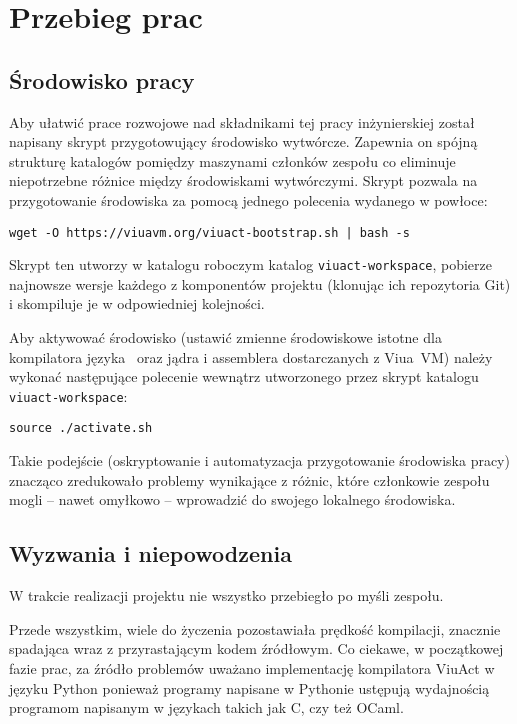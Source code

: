 \chapter{Przebieg prac}
\label{przebieg_prac}

\section*{Środowisko pracy}

Aby ułatwić prace rozwojowe nad składnikami tej pracy inżynierskiej został
napisany skrypt przygotowujący środowisko wytwórcze. Zapewnia on spójną
strukturę katalogów pomiędzy maszynami członków zespołu co eliminuje
niepotrzebne różnice między środowiskami wytwórczymi. Skrypt pozwala na
przygotowanie środowiska za pomocą jednego polecenia wydanego w powłoce:
\begin{lstlisting}
wget -O https://viuavm.org/viuact-bootstrap.sh | bash -s
\end{lstlisting}

Skrypt ten utworzy w katalogu roboczym katalog \texttt{viuact-workspace},
pobierze najnowsze wersje każdego z komponentów projektu (klonując ich
repozytoria Git) i skompiluje je w odpowiedniej kolejności.

Aby aktywować środowisko (ustawić zmienne środowiskowe istotne dla kompilatora
języka \ViuAct\ oraz jądra i assemblera dostarczanych z Viua~VM) należy wykonać
następujące polecenie wewnątrz utworzonego przez skrypt katalogu
\texttt{viuact-workspace}:
\begin{lstlisting}
source ./activate.sh
\end{lstlisting}

Takie podejście (oskryptowanie i automatyzacja przygotowanie środowiska pracy)
znacząco zredukowało problemy wynikające z różnic, które członkowie zespołu
mogli -- nawet omyłkowo -- wprowadzić do swojego lokalnego środowiska.







\section{Wyzwania i niepowodzenia}

W trakcie realizacji projektu nie wszystko przebiegło po myśli zespołu.

Przede wszystkim, wiele do życzenia pozostawiała prędkość kompilacji, znacznie
spadająca wraz z przyrastającym kodem źródłowym. Co ciekawe, w początkowej fazie
prac, za źródło problemów uważano implementację kompilatora ViuAct w języku
Python ponieważ programy napisane w Pythonie ustępują wydajnością programom
napisanym w językach takich jak C, czy też OCaml.

